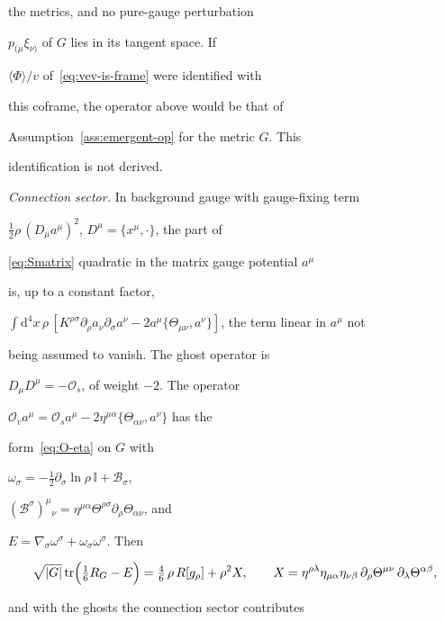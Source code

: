 the metrics, and no pure-gauge perturbation

\(p_{(\mu}\xi_{\nu)}\) of \(G\) lies in its tangent space. If

\(\langle\Phi\rangle/v\) of~\eqref{eq:vev-is-frame} were identified with

this coframe, the operator above would be that of

Assumption~\ref{ass:emergent-op} for the metric \(G\). This

identification is not derived.



\emph{Connection sector.} In background gauge with gauge-fixing term

\(\tfrac12\rho\,(D_\mu a^\mu)^2\), \(D^\mu=\{x^\mu,\cdot\}\), the part of

\eqref{eq:Smatrix} quadratic in the matrix gauge potential \(a^\mu\)

is, up to a constant factor,

\(\int\mathrm{d}^4x\,\rho\,[K^{\rho\sigma}\partial_\rho a_\nu\partial_\sigma a^\nu

-2a^\mu\{\Theta_{\mu\nu},a^\nu\}]\), the term linear in \(a^\mu\) not

being assumed to vanish. The ghost operator is

\(D_\mu D^\mu=-\mathcal O_s\), of weight \(-2\). The operator

\(\mathcal O_va^\mu=\mathcal O_sa^\mu

-2\eta^{\mu\alpha}\{\Theta_{\alpha\nu},a^\nu\}\) has the

form~\eqref{eq:O-eta} on \(G\) with

\(\omega_\sigma=-\tfrac12\partial_\sigma\ln\rho\,\mathbb I+\mathcal B_\sigma\),

\((\mathcal B^\sigma)^\mu{}_\nu=\eta^{\mu\alpha}\Theta^{\rho\sigma}

\partial_\rho\Theta_{\alpha\nu}\), and

\(E=\nabla_\sigma\omega^\sigma+\omega_\sigma\omega^\sigma\). Then

\[

  \sqrt{|G|}\operatorname{tr}\Bigl(\tfrac16R_G-E\Bigr)

  =\tfrac46\,\rho\,R[g_\rho]+\rho^2X,\qquad

  X=\eta^{\rho\lambda}\eta_{\mu\alpha}\eta_{\nu\beta}\,

    \partial_\rho\Theta^{\mu\nu}\,\partial_\lambda\Theta^{\alpha\beta},

\]

and with the ghosts the connection sector contributes


